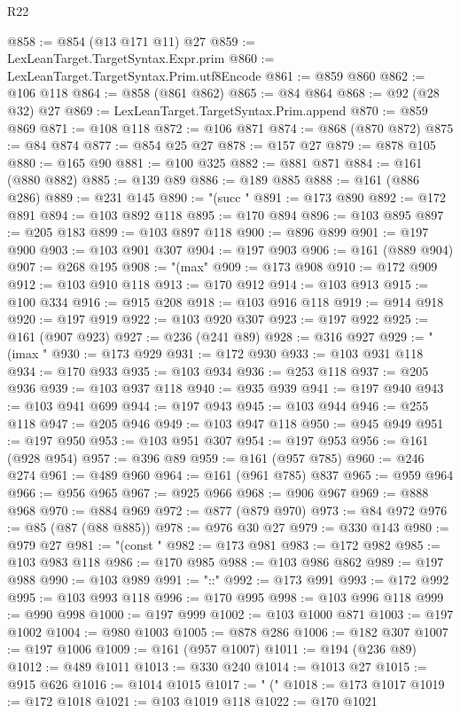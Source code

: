 \begin{lexlean}{R22}
\begin{coremodule}
@858 := @854 (@13 @171 @11) @27
@859 := LexLeanTarget.TargetSyntax.Expr.prim
@860 := LexLeanTarget.TargetSyntax.Prim.utf8Encode
@861 := @859 @860
@862 := @106 @118
@864 := @858 (@861 @862)
@865 := @84 @864
@868 := @92 (@28 @32) @27
@869 := LexLeanTarget.TargetSyntax.Prim.append
@870 := @859 @869
@871 := @108 @118
@872 := @106 @871
@874 := @868 (@870 @872)
@875 := @84 @874
@877 := @854 @25 @27
@878 := @157 @27
@879 := @878 @105
@880 := @165 @90
@881 := @100 @325
@882 := @881 @871
@884 := @161 (@880 @882)
@885 := @139 @89
@886 := @189 @885
@888 := @161 (@886 @286)
@889 := @231 @145
@890 := "(succ "
@891 := @173 @890
@892 := @172 @891
@894 := @103 @892 @118
@895 := @170 @894
@896 := @103 @895
@897 := @205 @183
@899 := @103 @897 @118
@900 := @896 @899
@901 := @197 @900
@903 := @103 @901 @307
@904 := @197 @903
@906 := @161 (@889 @904)
@907 := @268 @195
@908 := "(max"
@909 := @173 @908
@910 := @172 @909
@912 := @103 @910 @118
@913 := @170 @912
@914 := @103 @913
@915 := @100 @334
@916 := @915 @208
@918 := @103 @916 @118
@919 := @914 @918
@920 := @197 @919
@922 := @103 @920 @307
@923 := @197 @922
@925 := @161 (@907 @923)
@927 := @236 (@241 @89)
@928 := @316 @927
@929 := "(imax "
@930 := @173 @929
@931 := @172 @930
@933 := @103 @931 @118
@934 := @170 @933
@935 := @103 @934
@936 := @253 @118
@937 := @205 @936
@939 := @103 @937 @118
@940 := @935 @939
@941 := @197 @940
@943 := @103 @941 @699
@944 := @197 @943
@945 := @103 @944
@946 := @255 @118
@947 := @205 @946
@949 := @103 @947 @118
@950 := @945 @949
@951 := @197 @950
@953 := @103 @951 @307
@954 := @197 @953
@956 := @161 (@928 @954)
@957 := @396 @89
@959 := @161 (@957 @785)
@960 := @246 @274
@961 := @489 @960
@964 := @161 (@961 @785) @837
@965 := @959 @964
@966 := @956 @965
@967 := @925 @966
@968 := @906 @967
@969 := @888 @968
@970 := @884 @969
@972 := @877 (@879 @970)
@973 := @84 @972
@976 := @85 (@87 (@88 @885))
@978 := @976 @30 @27
@979 := @330 @143
@980 := @979 @27
@981 := "(const "
@982 := @173 @981
@983 := @172 @982
@985 := @103 @983 @118
@986 := @170 @985
@988 := @103 @986 @862
@989 := @197 @988
@990 := @103 @989
@991 := "::"
@992 := @173 @991
@993 := @172 @992
@995 := @103 @993 @118
@996 := @170 @995
@998 := @103 @996 @118
@999 := @990 @998
@1000 := @197 @999
@1002 := @103 @1000 @871
@1003 := @197 @1002
@1004 := @980 @1003
@1005 := @878 @286
@1006 := @182 @307
@1007 := @197 @1006
@1009 := @161 (@957 @1007)
@1011 := @194 (@236 @89)
@1012 := @489 @1011
@1013 := @330 @240
@1014 := @1013 @27
@1015 := @915 @626
@1016 := @1014 @1015
@1017 := " ("
@1018 := @173 @1017
@1019 := @172 @1018
@1021 := @103 @1019 @118
@1022 := @170 @1021

\end{coremodule}
\end{lexlean}
